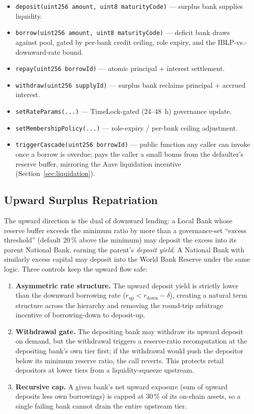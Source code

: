 \documentclass[12pt,a4paper]{report}
\begin{document}
\begin{itemize}[noitemsep]
\item \texttt{deposit(uint256 amount, uint8 maturityCode)} --- surplus bank supplies liquidity.
\item \texttt{borrow(uint256 amount, uint8 maturityCode)} --- deficit bank draws against pool, gated by per-bank credit ceiling, role expiry, and the IBLP-vs.-downward-rate bound.
\item \texttt{repay(uint256 borrowId)} --- atomic principal + interest settlement.
\item \texttt{withdraw(uint256 supplyId)} --- surplus bank reclaims principal + accrued interest.
\item \texttt{setRateParams(...)} --- TimeLock-gated (24--48~h) governance update.
\item \texttt{setMembershipPolicy(...)} --- role-expiry / per-bank ceiling adjustment.
\item \texttt{triggerCascade(uint256 borrowId)} --- public function any caller can invoke once a borrow is overdue; pays the caller a small bonus from the defaulter's reserve buffer, mirroring the Aave liquidation incentive (Section~\ref{sec:liquidation}).
\end{itemize}

\subsection{Upward Surplus Repatriation}
\label{sec:upward-flow}

The upward direction is the dual of downward lending: a Local Bank whose reserve buffer exceeds the minimum ratio by more than a governance-set ``excess threshold'' (default 20\,\% above the minimum) may deposit the excess into its parent National Bank, earning the parent's \emph{deposit yield}. A National Bank with similarly excess capital may deposit into the World Bank Reserve under the same logic. Three controls keep the upward flow safe:

\begin{enumerate}[noitemsep]
\item \textbf{Asymmetric rate structure.} The upward deposit yield is strictly lower than the downward borrowing rate ($r_{\text{up}} < r_{\text{down}} - \delta$), creating a natural term structure across the hierarchy and removing the round-trip arbitrage incentive of borrowing-down to deposit-up.
\item \textbf{Withdrawal gate.} The depositing bank may withdraw its upward deposit on demand, but the withdrawal triggers a reserve-ratio recomputation at the depositing bank's own tier first; if the withdrawal would push the depositor below its minimum reserve ratio, the call reverts. This protects retail depositors at lower tiers from a liquidity-squeeze upstream.
\item \textbf{Recursive cap.} A given bank's net upward exposure (sum of upward deposits less own borrowings) is capped at 30\,\% of its on-chain assets, so a single failing bank cannot drain the entire upstream tier.
\end{enumerate}
\end{document}

